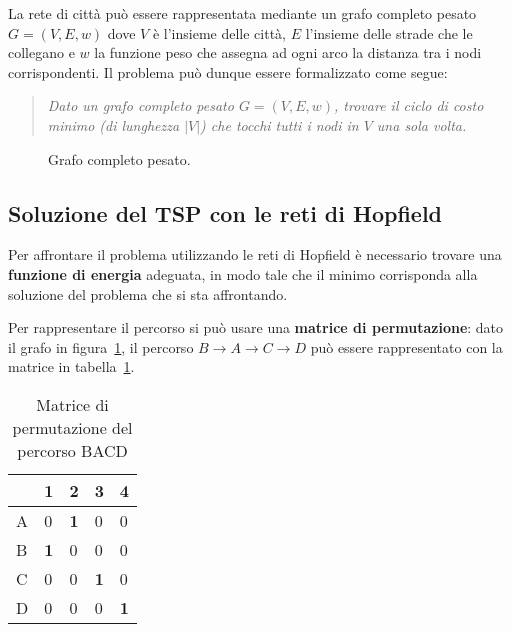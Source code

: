 La rete di città può essere rappresentata mediante un grafo completo pesato $G = (V, E, w)$ dove $V$ è l'insieme delle città, $E$ l'insieme delle strade che le collegano e $w$ la funzione peso che assegna ad ogni arco la distanza tra i nodi corrispondenti. Il problema può dunque essere formalizzato come segue:
\begin{quote}
	\emph{Dato un grafo completo pesato $G=(V, E, w)$, trovare il ciclo di costo minimo (di lunghezza $|V|$) che tocchi tutti i nodi in $V$ una sola volta.}
\end{quote}
\vspace{-10pt}
\begin{figure}[h!]
	\centering
	\caption{Grafo completo pesato.}\label{fig:graph}
\end{figure}

\subsection{Soluzione del TSP con le reti di Hopfield}
\label{sub:soluzione_del_tsp_con_le_reti_di_hopfield}

Per affrontare il problema utilizzando le reti di Hopfield è necessario trovare una \textbf{funzione di energia} adeguata, in modo tale che il minimo corrisponda alla soluzione del problema che si sta affrontando.

Per rappresentare il percorso si può usare una \textbf{matrice di permutazione}: dato il grafo in figura~\ref{fig:graph}, il percorso $B \rightarrow A \rightarrow C \rightarrow D$ può essere rappresentato con la matrice in tabella~\ref{tab:matperm}.

\begin{table}[h!]
	\centering
	\begin{tabularx}{8cm}{lXXXX}
		\toprule
		\backslashbox{Città}{Fermata} & 1 & 2 & 3 & 4 \\
		\midrule
		A & 0 & \textbf{1} & 0 & 0 \\
		B & \textbf{1} & 0 & 0 & 0 \\
		C & 0 & 0 & \textbf{1} & 0 \\
		D & 0 & 0 & 0 & \textbf{1} \\
		\bottomrule
	\end{tabularx}
	\caption{Matrice di permutazione del percorso BACD}
	\label{tab:matperm}
\end{table}


